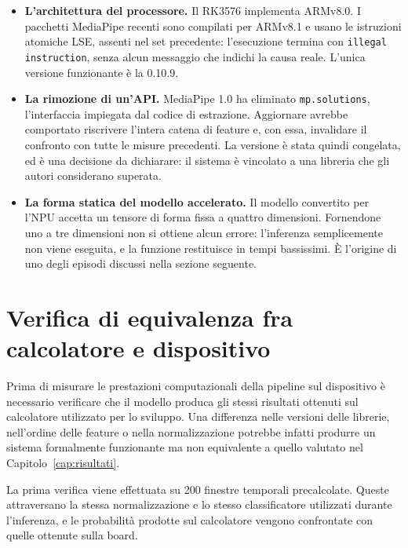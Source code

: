 \begin{itemize}

\item \textbf{L'architettura del processore.} Il RK3576 implementa ARMv8.0. I pacchetti MediaPipe recenti sono compilati per ARMv8.1 e usano le istruzioni atomiche LSE, assenti nel set precedente: l'esecuzione termina con \texttt{illegal instruction}, senza alcun messaggio che indichi la causa reale. L'unica versione funzionante è la 0.10.9.

\item \textbf{La rimozione di un'API.} MediaPipe 1.0 ha eliminato \texttt{mp.solutions}, l'interfaccia impiegata dal codice di estrazione. Aggiornare avrebbe comportato riscrivere l'intera catena di feature e, con essa, invalidare il confronto con tutte le misure precedenti. La versione è stata quindi congelata, ed è una decisione da dichiarare: il sistema è vincolato a una libreria che gli autori considerano superata.

\item \textbf{La forma statica del modello accelerato.} Il modello convertito per l'NPU accetta un tensore di forma fissa a quattro dimensioni. Fornendone uno a tre dimensioni non si ottiene alcun errore: l'inferenza semplicemente non viene eseguita, e la funzione restituisce in tempi bassissimi. È l'origine di uno degli episodi discussi nella sezione seguente.

\end{itemize}

\section{Verifica di equivalenza fra calcolatore e dispositivo}
\label{sec:parita}

Prima di misurare le prestazioni computazionali della pipeline sul dispositivo è necessario verificare che il modello produca gli stessi risultati ottenuti sul calcolatore utilizzato per lo sviluppo. Una differenza nelle versioni delle librerie, nell'ordine delle feature o nella normalizzazione potrebbe infatti produrre un sistema formalmente funzionante ma non equivalente a quello valutato nel Capitolo~\ref{cap:risultati}.

La prima verifica viene effettuata su 200 finestre temporali precalcolate. Queste attraversano la stessa normalizzazione e lo stesso classificatore utilizzati durante l'inferenza, e le probabilità prodotte sul calcolatore vengono confrontate con quelle ottenute sulla board.

